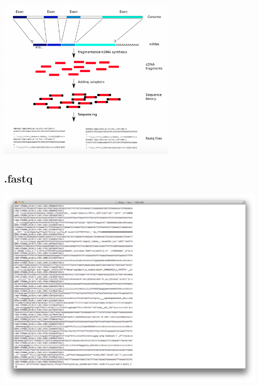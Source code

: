 \documentclass{beamer}\usepackage[]{graphicx}\usepackage[]{color}
\begin{document}
\begin{frame}
\begin{center}
\includegraphics[height=8cm]{Images/RNA2seq2}
\end{center}
\end{frame}

\subsection{.fastq}
\begin{frame}
\includegraphics[width=15cm]{Images/fastqless.pdf}
\end{frame}
\end{document}
